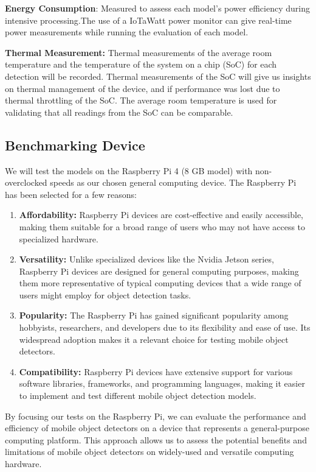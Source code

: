\documentclass[10pt,twocolumn,letterpaper]{article}
\begin{document}
\textbf{Energy Consumption}: Measured to assess each model’s power efficiency during intensive processing.The use of a IoTaWatt power monitor can give real-time power measurements while running the evaluation of each model.

\textbf{Thermal Measurement:} Thermal measurements of the average room temperature and the temperature of the system on a chip (SoC) for each detection will be recorded. Thermal measurements of the SoC will give us insights on thermal management of the device, and if performance was lost due to thermal throttling of the SoC. The average room temperature is used for validating that all readings from the SoC can be comparable.

\subsection{Benchmarking Device}
\label{subsec:BenchmarkingDevice}

We will test the models on the Raspberry Pi 4 (8 GB model) with non-overclocked speeds as our chosen general computing device.
The Raspberry Pi has been selected for a few reasons:

\begin{enumerate}
    \item \textbf{Affordability:} Raspberry Pi devices are cost-effective and easily accessible, making them suitable for a broad range of users who may not have access to specialized hardware.
    \item \textbf{Versatility:} Unlike specialized devices like the Nvidia Jetson series, Raspberry Pi devices are designed for general computing purposes, making them more representative of typical computing devices that a wide range of users might employ for object detection tasks.
    \item \textbf{Popularity:} The Raspberry Pi has gained significant popularity among hobbyists, researchers, and developers due to its flexibility and ease of use. Its widespread adoption makes it a relevant choice for testing mobile object detectors.
    \item \textbf{Compatibility:} Raspberry Pi devices have extensive support for various software libraries, frameworks, and programming languages, making it easier to implement and test different mobile object detection models.
\end{enumerate}

By focusing our tests on the Raspberry Pi, we can evaluate the performance and efficiency of mobile object detectors on a device that represents a general-purpose computing platform.
This approach allows us to assess the potential benefits and limitations of mobile object detectors on widely-used and versatile computing hardware.
\end{document}
